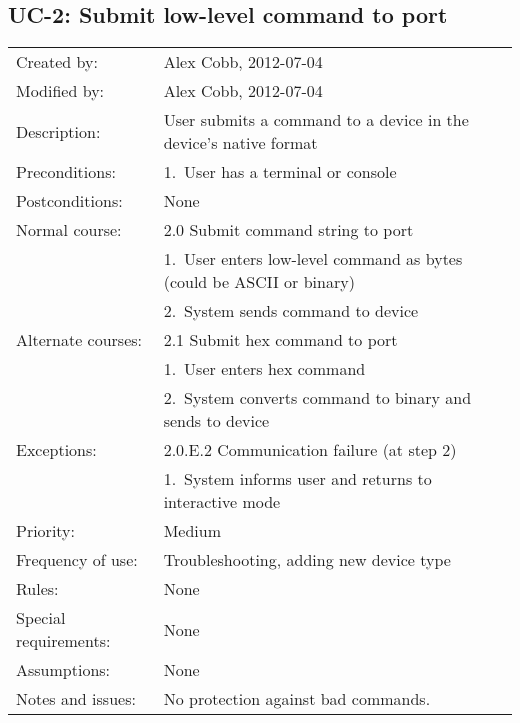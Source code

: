 \documentclass[pdftex,oneside,12pt,a4paper]{book}
\begin{document}
\subsection{UC-2: Submit low-level command to port}
\begin{tabular}{|l|p{10cm}|}\hline
Created by: & Alex Cobb, 2012-07-04 \\
Modified by: & Alex Cobb, 2012-07-04 \\\hline
Description: & User submits a command to a device in the device's native format \\\hline
Preconditions: & 1.\ User has a terminal or console \\\hline
Postconditions: & None \\\hline
Normal course: & 2.0 Submit command string to port\\
 & 1.\ User enters low-level command as bytes (could be ASCII or binary) \\
 & 2.\ System sends command to device\\\hline
Alternate courses: & 2.1 Submit hex command to port\\
 & 1.\ User enters hex command \\
 & 2.\ System converts command to binary and sends to device \\\hline
Exceptions: & 2.0.E.2 Communication failure (at step 2)\\
 & 1.\ System informs user and returns to interactive mode\\\hline
Priority: & Medium \\\hline
Frequency of use: & Troubleshooting, adding new device type\\\hline
Rules: & None\\\hline
Special requirements: & None\\\hline
Assumptions: & None\\\hline
Notes and issues: & No protection against bad commands.\\\hline
\end{tabular}
\end{document}
